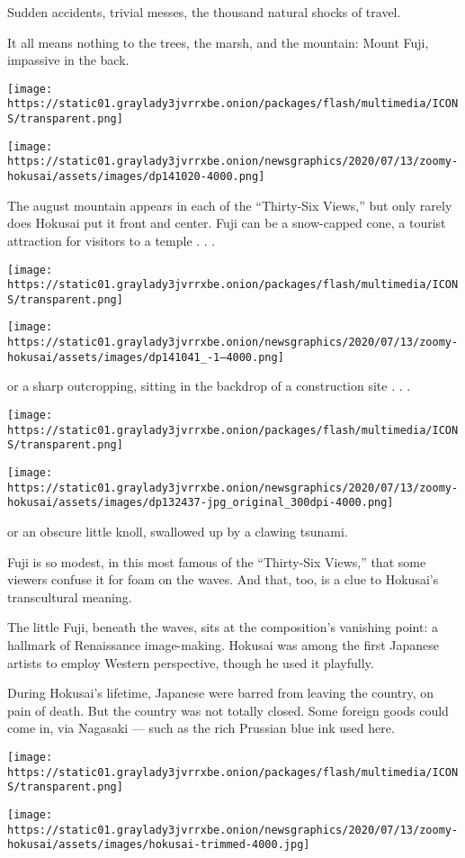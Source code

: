 Sudden accidents, trivial messes, the thousand natural shocks of travel.

It all means nothing to the trees, the marsh, and the mountain: Mount
Fuji, impassive in the back.

\texttt{[image: https://static01.graylady3jvrrxbe.onion/packages/flash/multimedia/ICONS/transparent.png]}

\texttt{[image: https://static01.graylady3jvrrxbe.onion/newsgraphics/2020/07/13/zoomy-hokusai/assets/images/dp141020-4000.png]}

The august mountain appears in each of the ``Thirty-Six Views,'' but
only rarely does Hokusai put it front and center. Fuji can be a
snow-capped cone, a tourist attraction for visitors to a temple . . .

\texttt{[image: https://static01.graylady3jvrrxbe.onion/packages/flash/multimedia/ICONS/transparent.png]}

\texttt{[image: https://static01.graylady3jvrrxbe.onion/newsgraphics/2020/07/13/zoomy-hokusai/assets/images/dp141041\_-1--4000.png]}

or a sharp outcropping, sitting in the backdrop of a construction site .
. .

\texttt{[image: https://static01.graylady3jvrrxbe.onion/packages/flash/multimedia/ICONS/transparent.png]}

\texttt{[image: https://static01.graylady3jvrrxbe.onion/newsgraphics/2020/07/13/zoomy-hokusai/assets/images/dp132437-jpg\_original\_300dpi-4000.png]}

or an obscure little knoll, swallowed up by a clawing tsunami.

Fuji is so modest, in this most famous of the ``Thirty-Six Views,'' that
some viewers confuse it for foam on the waves. And that, too, is a clue
to Hokusai's transcultural meaning.

The little Fuji, beneath the waves, sits at the composition's vanishing
point: a hallmark of Renaissance image-making. Hokusai was among the
first Japanese artists to employ Western perspective, though he used it
playfully.

During Hokusai's lifetime, Japanese were barred from leaving the
country, on pain of death. But the country was not totally closed. Some
foreign goods could come in, via Nagasaki --- such as the rich Prussian
blue ink used here.

\texttt{[image: https://static01.graylady3jvrrxbe.onion/packages/flash/multimedia/ICONS/transparent.png]}

\texttt{[image: https://static01.graylady3jvrrxbe.onion/newsgraphics/2020/07/13/zoomy-hokusai/assets/images/hokusai-trimmed-4000.jpg]}

